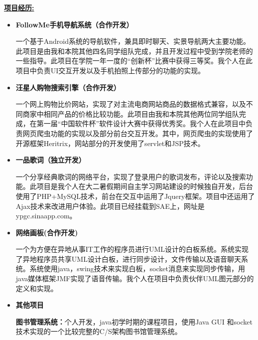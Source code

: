 \documentclass[12pt]{article}
\begin{document}
\bigskip
{\large \textbf{\underline{项目经历:}}}\\
\medskip
\begin{itemize}
  \item \textbf{FollowMe手机导航系统（合作开发）}\\
     \begin{small}
     一个基于Android系统的导航软件，兼具即时聊天、实景导航两大主要功能。此项目是由我和本院其他四名同学组队完成，并且开发过程中受到学院老师的一些指导。此项目在学院一年一度的“创新杯”比赛中获得三等奖。我个人在此项目中负责UI交互开发以及手机拍照上传部分的功能的实现。
     \end{small}
  \item \textbf{汪星人购物搜索引擎（合作开发）}\\
     \begin{small}
     一个网上购物比价网站，实现了对主流电商网站商品的数据格式兼容，以及不同商家中相同产品的价格比较功能。此项目由我和本院其他两位同学组队完成，在第一届“中国软件杯”软件设计大赛中获得优秀奖。我个人在此项目中负责网页爬虫功能的实现以及部分前台交互开发。其中，网页爬虫的实现使用了开源框架Heritrix，网站部分的开发使用了servlet和JSP技术。
     \end{small}
  \item \textbf{一品歌词（独立开发）} \\
    \begin{small}
     一个分享经典歌词的网络平台，实现了登录用户的歌词发布，评论以及搜索功能。此项目是我个人在大二暑假期间自主学习网站建设的时候独自开发，后台使用了PHP+MySQL技术，前台在交互中运用了Jquery框架。项目中还运用了Ajax技术来改进用户体验。此项目已经挂载到SAE上，网址是ypgc.sinaapp.com。
     \end{small}
  \item \textbf{网络画板(合作开发)}\\
    \begin{small}
     一个为方便在异地从事IT工作的程序员进行UML设计的白板系统。系统实现了异地程序员共享UML设计白板，进行同步设计，文件传输以及语音聊天系统。系统使用java，swing技术来实现白板，socket消息来实现同步传输，用java媒体框架JMF实现了语音传输。我个人在项目中负责伙伴UML图元部分的定义和实现。 
     \end{small}
  \item \textbf{其他项目}\\
    \begin{small}
     \textbf{图书管理系统：}个人开发，java初学时期的课程项目，使用Java GUI 和socket技术实现的一个比较完整的C/S架构图书馆管理系统。\\

\end{small}
\end{itemize}
\end{document}
